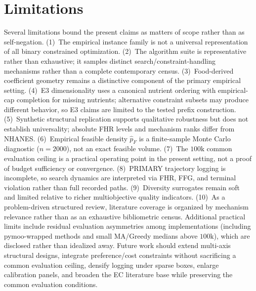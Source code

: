 \documentclass[lettersize,journal]{IEEEtran}
\begin{document}
\section{Limitations}
\label{sec:limit}
Several limitations bound the present claims as matters of scope rather than as self-negation.
(1)~The empirical instance family is not a universal representation of all binary constrained optimization.
(2)~The algorithm suite is representative rather than exhaustive; it samples distinct search/constraint-handling mechanisms rather than a complete contemporary census.
(3)~Food-derived coefficient geometry remains a distinctive component of the primary empirical setting.
(4)~E3 dimensionality uses a canonical nutrient ordering with empirical-cap completion for missing nutrients; alternative constraint subsets may produce different behavior, so E3 claims are limited to the tested prefix construction.
(5)~Synthetic structural replication supports qualitative robustness but does not establish universality; absolute FHR levels and mechanism ranks differ from NHANES.
(6)~Empirical feasible density $\hat p_F$ is a finite-sample Monte Carlo diagnostic ($n{=}2000$), not an exact feasible volume.
(7)~The $100\mathrm{k}$ common evaluation ceiling is a practical operating point in the present setting, not a proof of budget sufficiency or convergence.
(8)~PRIMARY trajectory logging is incomplete, so search dynamics are interpreted via FHR, FFG, and terminal violation rather than full recorded paths.
(9)~Diversity surrogates remain soft and limited relative to richer multiobjective quality indicators.
(10)~As a problem-driven structured review, literature coverage is organized by mechanism relevance rather than as an exhaustive bibliometric census.
Additional practical limits include residual evaluation asymmetries among implementations (including pymoo-wrapped methods and small MA/Greedy medians above $100\mathrm{k}$), which are disclosed rather than idealized away.
Future work should extend multi-axis structural designs, integrate preference/cost constraints without sacrificing a common evaluation ceiling, densify logging under sparse boxes, enlarge calibration panels, and broaden the EC literature base while preserving the common evaluation conditions.
\end{document}
